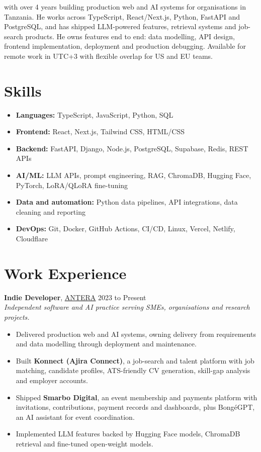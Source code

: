 \documentclass[12pt]{article}
\newcommand{\hlink}[2]{\href{#1}{\textcolor{linkblue}{\underline{#2}}}}
\begin{document}
 with over 4 years building production web and AI systems for organisations in Tanzania. He works across TypeScript, React/Next.js, Python, FastAPI and PostgreSQL, and has shipped LLM-powered features, retrieval systems and job-search products. He owns features end to end: data modelling, API design, frontend implementation, deployment and production debugging. Available for remote work in UTC+3 with flexible overlap for US and EU teams.

\section*{Skills}
\begin{itemize}
  \item \textbf{Languages:} TypeScript, JavaScript, Python, SQL
  \item \textbf{Frontend:} React, Next.js, Tailwind CSS, HTML/CSS
  \item \textbf{Backend:} FastAPI, Django, Node.js, PostgreSQL, Supabase, Redis, REST APIs
  \item \textbf{AI/ML:} LLM APIs, prompt engineering, RAG, ChromaDB, Hugging Face, PyTorch, LoRA/QLoRA fine-tuning
  \item \textbf{Data and automation:} Python data pipelines, API integrations, data cleaning and reporting
  \item \textbf{DevOps:} Git, Docker, GitHub Actions, CI/CD, Linux, Vercel, Netlify, Cloudflare
\end{itemize}

\section*{Work Experience}

\textbf{Indie Developer}, \hlink{https://antera.co.tz}{ANTERA} \hfill 2023 to Present\\
\emph{Independent software and AI practice serving SMEs, organisations and research projects.}
\begin{itemize}
  \item Delivered production web and AI systems, owning delivery from requirements and data modelling through deployment and maintenance.
  \item Built \textbf{Konnect (Ajira Connect)}, a job-search and talent platform with job matching, candidate profiles, ATS-friendly CV generation, skill-gap analysis and employer accounts.
  \item Shipped \textbf{Smarbo Digital}, an event membership and payments platform with invitations, contributions, payment records and dashboards, plus Bong\'eGPT, an AI assistant for event coordination.
  \item Implemented LLM features backed by Hugging Face models, ChromaDB retrieval and fine-tuned open-weight models.
\end{itemize}
\end{document}
